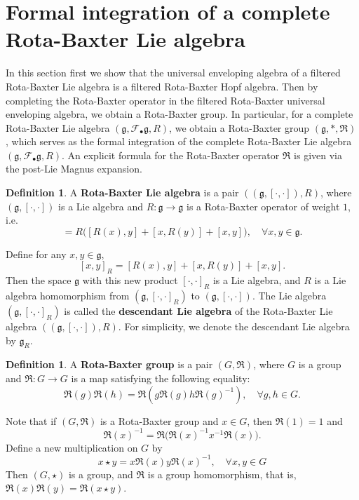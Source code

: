 \documentclass[12pt]{amsart}
\theoremstyle{definition}   %
\newtheorem{defi}[thm]{Definition}
\newcommand{\g}{\mathfrak g}
\newcommand{\huaF}{\mathcal{F}}
\newcommand{\frkR}{\mathfrak R}
\begin{document}
\section{Formal integration of a complete Rota-Baxter Lie algebra}\label{sec:intRB}

In this section first we show that the universal enveloping algebra of a filtered Rota-Baxter Lie algebra is a filtered Rota-Baxter Hopf algebra. Then by completing the Rota-Baxter operator in the filtered Rota-Baxter universal enveloping algebra, we obtain a Rota-Baxter group. In particular, for a complete Rota-Baxter Lie algebra $(\g, \huaF_{\bullet}\g, R)$, we obtain a Rota-Baxter group  $(\g,*,\frkR)$, which serves as the formal integration of the complete Rota-Baxter Lie algebra $(\g, \huaF_{\bullet}\g, R)$. An explicit formula for the Rota-Baxter operator $\frkR$ is given via the post-Lie Magnus expansion.

\begin{defi} \label{defi:O}
A {\bf Rota-Baxter Lie algebra} is a pair $((\g,[\cdot,\cdot]), R)$, where $(\g,[\cdot,\cdot])$ is a Lie algebra and $R:\g\longrightarrow\g$ is a  { Rota-Baxter operator of weight $1$}, i.e.
 \begin{equation}
[R(x),R(y)]=R\big([R(x),y]+ [x,R(y)]+[x,y] \big), \quad \forall x, y \in \g.
 \end{equation}
 \end{defi}
Define for any $x,y\in \g$,
$$
[x,y]_R=[R(x),y]+[x,R(y)]+[x,y].
$$
Then the space $\g$ with this  new product $[\cdot,\cdot]_R$ is a Lie algebra, and $R$ is a Lie algebra homomorphism from $(\g,[\cdot,\cdot]_R)$ to $(\g,[\cdot,\cdot])$. The Lie algebra $(\g,[\cdot,\cdot]_R)$ is called the {\bf descendant Lie algebra} of the Rota-Baxter Lie algebra $((\g,[\cdot,\cdot]), R)$. For simplicity, we denote the descendant Lie algebra by $\g_R$.




\begin{defi}{\rm \cite[Definition 2.1]{GLS}}
A {\bf Rota-Baxter group} is a pair $(G,\frkR)$, where $G$ is a group and $\frkR:G\rightarrow G$ is a map satisfying the following equality:
\begin{equation}\label{defi:1}
    \frkR(g)\frkR(h)=\frkR(g\frkR(g)h\frkR(g)^{-1}), \quad \forall g,h\in G.
\end{equation}
\end{defi}

Note that if $(G,\frkR)$ is a Rota-Baxter group and $x\in G$, then $\frkR(1)=1$ and $$\frkR(x)^{-1}=\frkR\Big(\frkR(x)^{-1}x^{-1}\frkR(x)\Big).$$ Define a new multiplication on $G$ by $$x\star y=x\frkR(x)y\frkR(x)^{-1},\quad \forall x,y\in G$$ Then $(G,\star)$ is a group, and $\frkR$ is a group homomorphism, that is, $\frkR(x)\frkR(y)=\frkR(x\star y)$.
\end{document}
